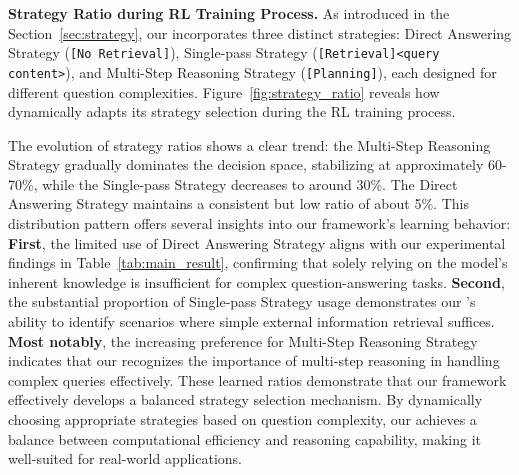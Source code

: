 \textbf{Strategy Ratio during RL Training Process.}
As introduced in the Section~\ref{sec:strategy}, our \modelname incorporates three distinct strategies: Direct Answering Strategy (\texttt{[No Retrieval]}), Single-pass Strategy (\texttt{[Retrieval]<query content>}), and Multi-Step Reasoning Strategy (\texttt{[Planning]}), each designed for different question complexities. 
Figure~\ref{fig:strategy_ratio} reveals how \modelname dynamically adapts its strategy selection during the RL training process.

The evolution of strategy ratios shows a clear trend: the Multi-Step Reasoning Strategy gradually dominates the decision space, stabilizing at approximately 60-70\%, while the Single-pass Strategy decreases to around 30\%. The Direct Answering Strategy maintains a consistent but low ratio of about 5\%. This distribution pattern offers several insights into our framework's learning behavior:
\textbf{First}, the limited use of Direct Answering Strategy aligns with our experimental findings in Table~\ref{tab:main_result}, confirming that solely relying on the model's inherent knowledge is insufficient for complex question-answering tasks.
\textbf{Second}, the substantial proportion of Single-pass Strategy usage demonstrates our \modelname's ability to identify scenarios where simple external information retrieval suffices.
\textbf{Most notably}, the increasing preference for Multi-Step Reasoning Strategy indicates that our \modelname recognizes the importance of multi-step reasoning in handling complex queries effectively.
These learned ratios demonstrate that our framework effectively develops a balanced strategy selection mechanism.
By dynamically choosing appropriate strategies based on question complexity, our \modelname achieves a balance between computational efficiency and reasoning capability, making it well-suited for real-world applications.

